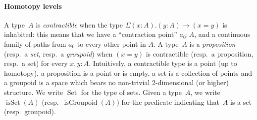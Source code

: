 \documentclass[10pt,a4paper]{amsart}
\theoremstyle{definition}
\let\S\undefined
\newcommand{\S}[1]{\operatorname{S}^{#1}} %
\newcommand{\equivto}{\simeq} %
\newcommand{\isSet}{\operatorname{isSet}} %
\newcommand{\isGroupoid}{\operatorname{isGroupoid}} %
\newcommand{\Set}{\operatorname{Set}} %
\newcommand{\ie}{i.e.~}
\newcommand{\resp}{resp.~}
\newcommand{\TODO}[1]{\marginpar{\tiny #1}}
\newcommand{\AR}[1]{\TODO{AR: #1}} %
\begin{document}
\paragraph{Homotopy levels}
A type~$A$ is \emph{contractible} when the type $\Sigma(x:A).(y:A)\to(x=y)$ is
inhabited: this means that we have a ``contraction point'' $a_0 : A$, and a
continuous family of paths from $a_0$ to every other point in $A$.
%
A type~$A$ is a \emph{proposition} (\resp a \emph{set}, \resp a
\emph{groupoid}) when $(x=y)$ is contractible (\resp a proposition, \resp a
set) for every $x,y:A$. Intuitively, a contractible type is a point (up to
homotopy), a proposition is a point or is empty, a set is a collection of points
and a groupoid is a space which bears no non-trivial 2-dimensional (or higher)
structure.
%
We write $\Set$ for the type of sets. Given a type~$A$, we write $\isSet(A)$ (\resp $\isGroupoid(A)$) for the predicate indicating that~$A$ is a set (\resp groupoid).
\end{document}
